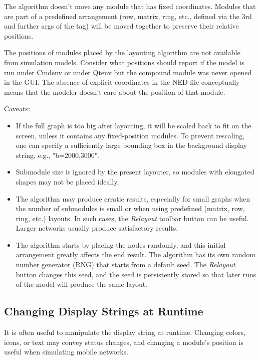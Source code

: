 The algorithm doesn't move any module that has fixed coordinates. Modules
that are part of a predefined arrangement (row, matrix, ring, etc., defined
via the 3rd and further args of the  tag) will be moved together
to preserve their relative positions.

\begin{note}
The positions of modules placed by the layouting algorithm are not available
from simulation models. Consider what positions {\opp} should report if the
model is run under Cmdenv or under Qtenv but the compound module was never
opened in the GUI. The absence of explicit coordinates in the NED file
conceptually means that the modeler doesn't care about the position of that
module.
\end{note}

Caveats:

\begin{itemize}
  \item If the full graph is too big after layouting, it will be scaled back to
    fit on the screen, unless it contains any fixed-position modules. To prevent
    rescaling, one can specify a sufficiently large bounding box in the background
    display string, e.g., "b=2000,3000".
  \item Submodule size is ignored by the present layouter, so modules with
    elongated shapes may not be placed ideally.
  \item The algorithm may produce erratic results, especially for small graphs
    when the number of submodules is small or when using predefined (matrix, row,
    ring, etc.) layouts. In such cases, the \textit{Relayout} toolbar button can
    be useful. Larger networks usually produce satisfactory results.
  \item The algorithm starts by placing the nodes randomly, and this initial
    arrangement greatly affects the end result. The algorithm has its own random
    number generator (RNG) that starts from a default seed. The \textit{Relayout}
    button changes this seed, and the seed is persistently stored so that later
    runs of the model will produce the same layout.
\end{itemize}


\subsection{Changing Display Strings at Runtime}
\label{sec:graphics:changing-displaystrings-at-runtime}

It is often useful to manipulate the display string at runtime. Changing colors,
icons, or text may convey status changes, and changing a module's position is
useful when simulating mobile networks.

